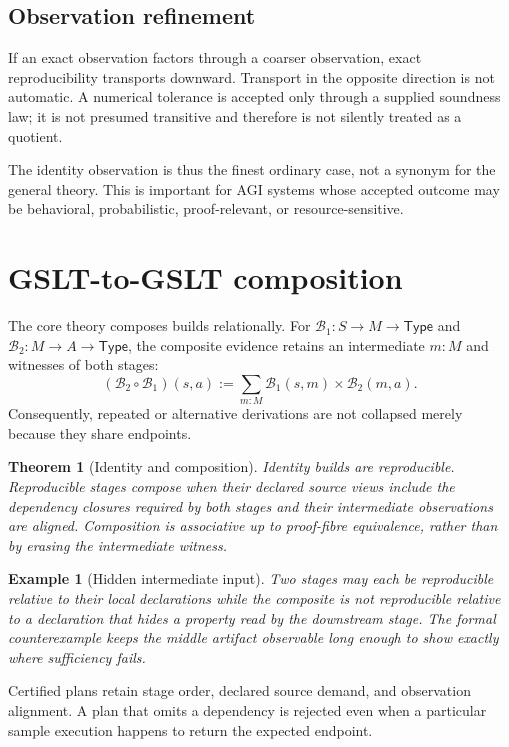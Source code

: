 \documentclass[11pt]{article}
\newtheorem{theorem}[definition]{Theorem}
\newtheorem{example}[definition]{Example}
\newcommand{\Build}{\mathcal{B}}
\begin{document}
\subsection{Observation refinement}

If an exact observation factors through a coarser observation, exact
reproducibility transports downward.  Transport in the opposite direction is
not automatic.  A numerical tolerance is accepted only through a supplied
soundness law; it is not presumed transitive and therefore is not silently
treated as a quotient.

The identity observation is thus the finest ordinary case, not a synonym for
the general theory.  This is important for AGI systems whose accepted outcome
may be behavioral, probabilistic, proof-relevant, or resource-sensitive.

\section{GSLT-to-GSLT composition}

The core theory composes builds relationally.  For
$\Build_1:S\to M\to\mathsf{Type}$ and
$\Build_2:M\to A\to\mathsf{Type}$, the composite evidence retains an
intermediate $m:M$ and witnesses of both stages:
\[
  (\Build_2\circ\Build_1)(s,a)
  := \sum_{m:M}\Build_1(s,m)\times\Build_2(m,a).
\]
Consequently, repeated or alternative derivations are not collapsed merely
because they share endpoints.

\begin{theorem}[Identity and composition]
Identity builds are reproducible.  Reproducible stages compose when their
declared source views include the dependency closures required by both stages
and their intermediate observations are aligned.  Composition is associative
up to proof-fibre equivalence, rather than by erasing the intermediate
witness.
\end{theorem}

\begin{example}[Hidden intermediate input]
Two stages may each be reproducible relative to their local declarations while
the composite is not reproducible relative to a declaration that hides a
property read by the downstream stage.  The formal counterexample keeps the
middle artifact observable long enough to show exactly where sufficiency
fails.
\end{example}

Certified plans retain stage order, declared source demand, and observation
alignment.  A plan that omits a dependency is rejected even when a particular
sample execution happens to return the expected endpoint.
\end{document}
